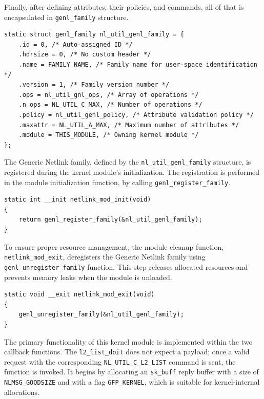 \documentclass[10pt, letterpaper]{article}
\begin{document}
Finally, after defining attributes, their policies, and commands, all of that is
encapsulated in \texttt{genl\_family} structure.

\begin{lstlisting}[caption={Generic Netlink family definition}]
static struct genl_family nl_util_genl_family = {
	.id = 0, /* Auto-assigned ID */
	.hdrsize = 0, /* No custom header */
	.name = FAMILY_NAME, /* Family name for user-space identification */
	.version = 1, /* Family version number */
	.ops = nl_util_gnl_ops, /* Array of operations */
	.n_ops = NL_UTIL_C_MAX, /* Number of operations */
	.policy = nl_util_genl_policy, /* Attribute validation policy */
	.maxattr = NL_UTIL_A_MAX, /* Maximum number of attributes */
	.module = THIS_MODULE, /* Owning kernel module */
};
\end{lstlisting}

The Generic Netlink family, defined by the \texttt{nl\_util\_genl\_family} structure, is
registered during the kernel module's initialization. The registration is performed in the
module initialization function, by calling \texttt{genl\_register\_family}.

\begin{lstlisting}[caption={Generic Netlink Family Registration},label={lst:family_registration}]
static int __init netlink_mod_init(void)
{
    return genl_register_family(&nl_util_genl_family);
}
\end{lstlisting}

To ensure proper resource management, the module cleanup function,
\texttt{netlink\_mod\_exit}, deregisters the Generic Netlink family using
\texttt{genl\_unregister\_family} function. This step releases allocated resources and prevents
memory leaks when the module is unloaded.

\begin{lstlisting}[caption={Generic Netlink Family Deregistration},label={lst:family_deregistration}]
static void __exit netlink_mod_exit(void)
{
    genl_unregister_family(&nl_util_genl_family);
}
\end{lstlisting}

The primary functionality of this kernel module is implemented within the two callback functions.
The \texttt{l2\_list\_doit} does not expect a payload; once a valid request with the
corresponding \texttt{NL\_UTIL\_C\_L2\_LIST} command is sent, the function is invoked. It
begins by allocating an \texttt{sk\_buff} reply buffer with a size of
\texttt{NLMSG\_GOODSIZE} and with a flag \texttt{GFP\_KERNEL}, which is suitable for
kernel-internal allocations.
\end{document}
